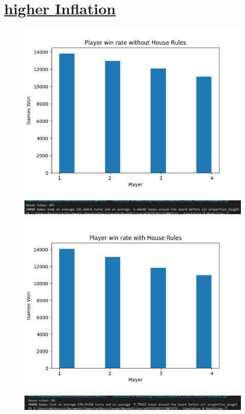\documentclass[a4paper,reqno,12pt]{report}
\begin{document}
\section*{\underline{higher Inflation}}
\begin{figure}[h]
\includegraphics[width=15cm]{highInflation.png}
\centering
\end{figure}
\begin{figure}[h]
\includegraphics[width=15cm]{highInflation_averages.png}
\centering
\end{figure}
\begin{figure}[h]
\includegraphics[width=15cm]{highInflation_houseRules.png}
\centering
\end{figure}
\begin{figure}[h]
\includegraphics[width=15cm]{highInflation_houserules_averages.png}
\centering
\end{figure}
\clearpage
\end{document}
